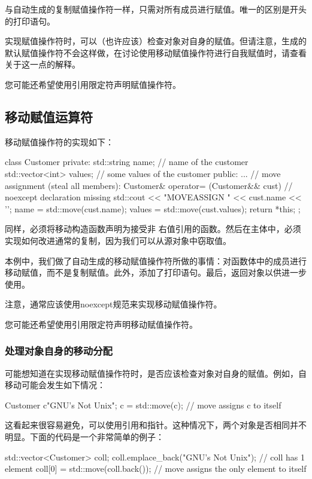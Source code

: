 与自动生成的复制赋值操作符一样，只需对所有成员进行赋值。唯一的区别是开头的打印语句。

实现赋值操作符时，可以（也许应该）检查对象对自身的赋值。但请注意，生成的默认赋值操作符不会这样做，在讨论使用移动赋值操作符进行自我赋值时，请查看关于这一点的解释。

您可能还希望使用引用限定符声明赋值操作符。

\subsection{移动赋值运算符}

移动赋值操作符的实现如下：

\begin{cppcode}
class Customer {
	private:
	std::string name; // name of the customer
	std::vector<int> values; // some values of the customer
	public:
	...
	// move assignment (steal all members):
	Customer& operator= (Customer&& cust) { // noexcept declaration missing
		std::cout << "MOVEASSIGN " << cust.name << '\n';
		name = std::move(cust.name);
		values = std::move(cust.values);
		return *this;
	}
};
\end{cppcode}

同样，必须将移动构造函数声明为接受非  右值引用的函数。然后在主体中，必须实现如何改进通常的复制，因为我们可以从源对象中窃取值。

本例中，我们做了自动生成的移动赋值操作符所做的事情：对函数体中的成员进行移动赋值，而不是复制赋值。此外，添加了打印语句。最后，返回对象以供进一步使用。

注意，通常应该使用noexcept规范来实现移动赋值操作符。

您可能还希望使用引用限定符声明移动赋值操作符。

\subsubsection{处理对象自身的移动分配}

可能想知道在实现移动赋值操作符时，是否应该检查对象对自身的赋值。例如，自移动可能会发生如下情况：

\begin{cppcode}
Customer c{"GNU's Not Unix"};
c = std::move(c); // move assigns c to itself
\end{cppcode}

这看起来很容易避免，可以使用引用和指针。这种情况下，两个对象是否相同并不明显。下面的代码是一个非常简单的例子：

\begin{cppcode}
std::vector<Customer> coll;
coll.emplace_back("GNU's Not Unix"); // coll has 1 element
coll[0] = std::move(coll.back()); // move assigns the only element to itself
\end{cppcode}

